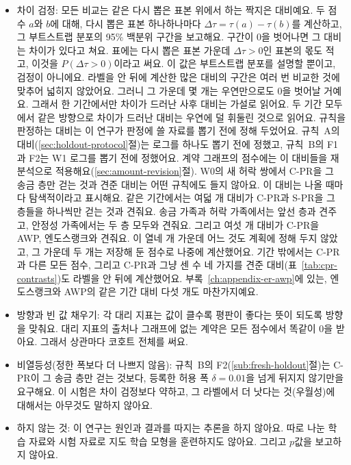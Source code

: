 \begin{itemize}
\item 차이 검정: 모든 비교는 같은 다시 뽑은 표본 위에서 하는 짝지은 대비예요. 두 점수 $a$와 $b$에 대해, 다시 뽑은 표본 하나하나마다 $\Delta\tau=\tau(a)-\tau(b)$를 계산하고, 그 부트스트랩 분포의 95\% 백분위 구간을 보고해요. 구간이 0을 벗어나면 그 대비는 차이가 있다고 쳐요. 표에는 다시 뽑은 표본 가운데 $\Delta\tau>0$인 표본의 몫도 적고, 이것을 $P(\Delta\tau>0)$이라고 써요. 이 값은 부트스트랩 분포를 설명할 뿐이고, 검정이 아니에요. 라벨을 안 뒤에 계산한 많은 대비의 구간은 여러 번 비교한 것에 맞추어 넓히지 않았어요. 그러니 그 가운데 몇 개는 우연만으로도 0을 벗어날 거예요. 그래서 한 기간에서만 차이가 드러난 사후 대비는 가설로 읽어요. 두 기간 모두에서 같은 방향으로 차이가 드러난 대비는 우연에 덜 휘둘린 것으로 읽어요. 규칙을 판정하는 대비는 이 연구가 판정에 쓸 자료를 뽑기 전에 정해 두었어요. 규칙~A의 대비(\ref{sec:holdout-protocol}절)는 로그를 하나도 뽑기 전에 정했고, 규칙~B의 F1과 F2는 W1 로그를 뽑기 전에 정했어요. 계약 그래프의 점수에는 이 대비들을 재분석으로 적용해요(\ref{sec:amount-revision}절). W0의 새 허락 쌍에서 \mbox{C-PR}을 그 송금 층만 걷는 것과 견준 대비는 어떤 규칙에도 들지 않아요. 이 대비는 나올 때마다 탐색적이라고 표시해요. 같은 기간에서는 여덟 개 대비가 \mbox{C-PR}과 \mbox{S-PR}을 그 층들을 하나씩만 걷는 것과 견줘요. 송금 가족과 허락 가족에서는 앞선 층과 견주고, 안정성 가족에서는 두 층 모두와 견줘요. 그리고 여섯 개 대비가 \mbox{C-PR}을 AWP, 엔도스랭크와 견줘요. 이 열네 개 가운데 어느 것도 계획에 정해 두지 않았고, 그 가운데 두 개는 저장해 둔 점수로 나중에 계산했어요. 기간 밖에서는 \mbox{C-PR}과 다른 모든 점수, 그리고 \mbox{C-PR}과 그냥 센 수 네 가지를 견준 대비(표~\ref{tab:cpr-contrasts})도 라벨을 안 뒤에 계산했어요. 부록~\ref{ch:appendix-er-awp}에 있는, 엔도스랭크와 AWP의 같은 기간 대비 다섯 개도 마찬가지예요.

\item 방향과 빈 값 채우기: 각 대리 지표는 값이 클수록 평판이 좋다는 뜻이 되도록 방향을 맞춰요. 대리 지표의 출처나 그래프에 없는 계약은 모든 점수에서 똑같이 0을 받아요. 그래서 상관마다 코호트 전체를 써요.

\item 비열등성(정한 폭보다 더 나쁘지 않음): 규칙~B의 F2(\ref{sub:fresh-holdout}절)는 \mbox{C-PR}이 그 송금 층만 걷는 것보다, 등록한 허용 폭 $\delta=0.01$을 넘게 뒤지지 않기만을 요구해요. 이 시험은 차이 검정보다 약하고, 그 라벨에서 더 낫다는 것(우월성)에 대해서는 아무것도 말하지 않아요.

\item 하지 않는 것: 이 연구는 원인과 결과를 따지는 추론을 하지 않아요. 따로 나눈 학습 자료와 시험 자료로 지도 학습 모형을 훈련하지도 않아요. 그리고 $p$값을 보고하지 않아요.

\end{itemize}

